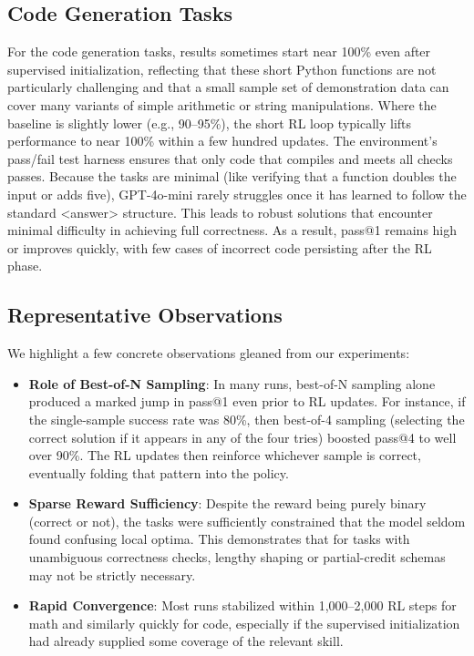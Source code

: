 \documentclass{article}
\begin{document}
\subsection{Code Generation Tasks}
For the code generation tasks, results sometimes start near 100\% even after supervised initialization, reflecting that these short Python functions are not particularly challenging and that a small sample set of demonstration data can cover many variants of simple arithmetic or string manipulations. Where the baseline is slightly lower (e.g., 90–95\%), the short RL loop typically lifts performance to near 100\% within a few hundred updates. The environment’s pass/fail test harness ensures that only code that compiles and meets all checks passes. Because the tasks are minimal (like verifying that a function doubles the input or adds five), GPT-4o-mini rarely struggles once it has learned to follow the standard <answer> structure. This leads to robust solutions that encounter minimal difficulty in achieving full correctness. As a result, pass@1 remains high or improves quickly, with few cases of incorrect code persisting after the RL phase.

\subsection{Representative Observations}
We highlight a few concrete observations gleaned from our experiments:
\begin{itemize}
\item \textbf{Role of Best-of-N Sampling}: In many runs, best-of-N sampling alone produced a marked jump in pass@1 even prior to RL updates. For instance, if the single-sample success rate was 80\%, then best-of-4 sampling (selecting the correct solution if it appears in any of the four tries) boosted pass@4 to well over 90\%. The RL updates then reinforce whichever sample is correct, eventually folding that pattern into the policy.
\item \textbf{Sparse Reward Sufficiency}: Despite the reward being purely binary (correct or not), the tasks were sufficiently constrained that the model seldom found confusing local optima. This demonstrates that for tasks with unambiguous correctness checks, lengthy shaping or partial-credit schemas may not be strictly necessary.
\item \textbf{Rapid Convergence}: Most runs stabilized within 1,000–2,000 RL steps for math and similarly quickly for code, especially if the supervised initialization had already supplied some coverage of the relevant skill.
\end{itemize}
\end{document}
